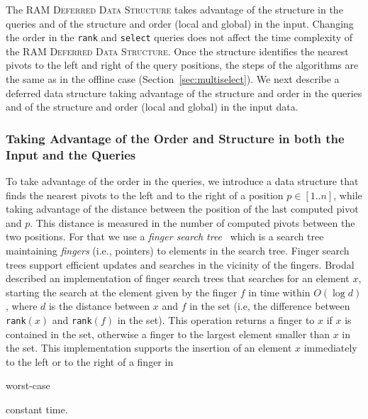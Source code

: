 The \textsc{RAM Deferred Data Structure} takes advantage of the
structure in the queries and of the structure and order (local and
global) in the input. Changing the order in the \texttt{rank} and
\texttt{select} queries does not affect the time complexity of the
\textsc{RAM Deferred Data Structure}. Once the structure
  identifies the nearest pivots to the left and right of the query
  positions, the steps of the algorithms are the same as in the
  offline case (Section~\ref{sec:multiselect}). We
next describe a deferred data structure taking advantage of the
structure and order in the queries and of the structure and order
(local and global) in the input data.

\subsubsection{Taking Advantage of the Order and Structure in both the Input and the Queries}

To take advantage of the order in the queries, we introduce a
data structure that finds the nearest pivots to the left and to the
right of a position $p\in[1..n]$, while taking advantage of the
distance between the position of the last computed pivot and $p$. This
distance is measured in the number of computed pivots between the two
positions. For that we use a \emph{finger search
  tree}~\cite{1998-SODA-FingerSearchTreesWithConstantInsertionTime-Brodal}
which is a search tree maintaining \emph{fingers} (i.e., pointers) to
elements in the search tree. Finger search trees support efficient
updates and searches in the vicinity of the
fingers. Brodal~\cite{1998-SODA-FingerSearchTreesWithConstantInsertionTime-Brodal}
described an implementation of finger search trees that
searches for an element $x$, starting the search at the element given by
the finger $f$ in time within $O(\log{d})$, where $d$ is the distance
between $x$ and $f$ in the set (i.e, the difference between
\texttt{rank}$(x)$ and \texttt{rank}$(f)$ in the set). This operation
returns a finger to $x$ if $x$ is contained in the set, otherwise a
finger to the largest element smaller than $x$ in the set. This
implementation supports the insertion of an element $x$ immediately to
the left or to the right of a finger in \begin{LONG}worst-case\end{LONG} constant
time.

